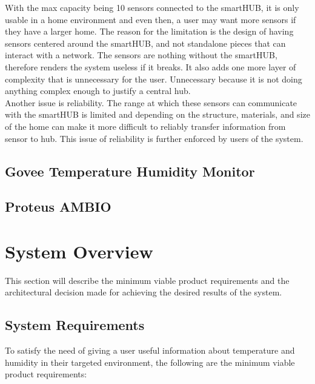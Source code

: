 \documentclass{article}
\begin{document}
With the max capacity being 10 sensors connected to the smartHUB, it is only usable in a home environment and even then, a user may want more sensors if they have a larger home. The reason for the limitation is the design of having sensors centered around the smartHUB, and not standalone pieces that can interact with a network. The sensors are nothing without the smartHUB, therefore renders the system useless if it breaks. It also adds one more layer of complexity that is unnecessary for the user. Unnecessary because it is not doing anything complex enough to justify a central hub.\\

Another issue is reliability. The range at which these sensors can communicate with the smartHUB is limited and depending on the structure, materials, and size of the home can make it more difficult to reliably transfer information from sensor to hub. This issue of reliability is further enforced by users of the system.

\subsection{Govee Temperature Humidity Monitor}
\subsection{Proteus AMBIO}

\section{System Overview}
\label{section:overview}
This section will describe the minimum viable product requirements and the architectural decision made for achieving the desired results of the system.

\subsection{System Requirements}
To satisfy the need of giving a user useful information about temperature and humidity in their targeted environment, the following are the minimum viable product requirements:
\end{document}
